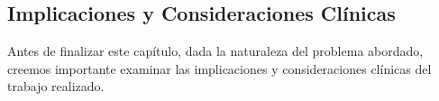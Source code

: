 

\subsection{Implicaciones y Consideraciones Clínicas}
\label{sec:implications_clinical}

Antes de finalizar este capítulo, dada la naturaleza del problema abordado, creemos importante examinar las implicaciones y consideraciones clínicas del trabajo realizado.

